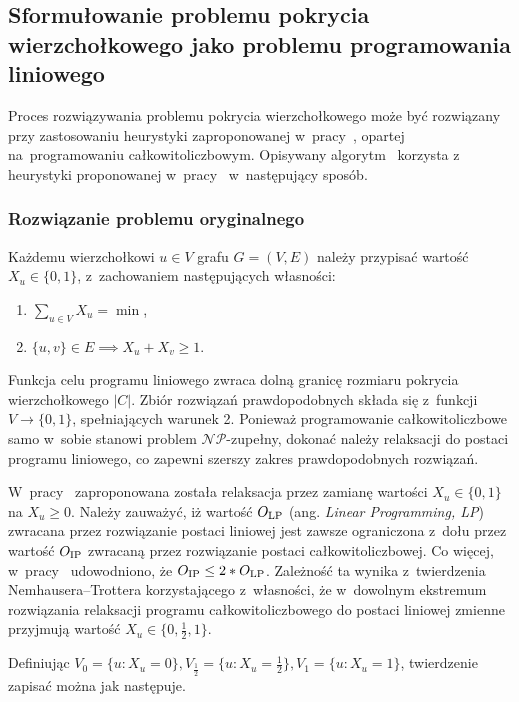 \subsection{Sformułowanie problemu pokrycia wierzchołkowego jako problemu programowania liniowego}\label{section_kernelization_lp_formulation}

Proces rozwiązywania problemu pokrycia wierzchołkowego może być rozwiązany
przy zastosowaniu heurystyki zaproponowanej w~pracy~\cite{hochbaum82}, opartej 
na~programowaniu całkowitoliczbowym.
Opisywany algorytm~\cite[rozdz.~4.2.2]{abukhzam03} korzysta z~ heurystyki proponowanej w~pracy~\cite{hochbaum82} 
w~następujący sposób.

\subsubsection{\textbf{Rozwiązanie problemu oryginalnego}}\label{ss_lp_original}
Każdemu wierzchołkowi $u \in V$ grafu $G=(V,E)$ należy przypisać wartość $X_u
\in \{0, 1\}$, z~zachowaniem następujących własności:
\begin{enumerate}
  \item $\sum_{u \in V}X_u = \min$,
  \item $\{u,v\} \in E \implies X_u + X_v \geq 1$.
\end{enumerate}

Funkcja celu programu liniowego zwraca dolną granicę rozmiaru pokrycia wierzchołkowego $|C|$.
Zbiór rozwiązań prawdopodobnych składa się z~funkcji $V \to \{0, 1\}$,
spełniających warunek 2.
Ponieważ programowanie całkowitoliczbowe samo w~sobie stanowi
problem $\mathcal{NP}$-zupełny, dokonać należy relaksacji do postaci programu liniowego, co
zapewni szerszy zakres prawdopodobnych rozwiązań.

W~pracy~\cite{khuller02} zaproponowana została relaksacja przez zamianę wartości 
$X_u \in \{0,1\}$ na $X_u \geq 0$.
Należy zauważyć, iż wartość $O_{\textnormal{LP}}$ (ang. \emph{Linear Programming, LP}) zwracana przez rozwiązanie postaci 
liniowej jest zawsze ograniczona z~dołu przez wartość $O_{\textnormal{IP}}$ zwracaną przez 
rozwiązanie postaci całkowitoliczbowej.
Co więcej, w~pracy~\cite{khuller02} udowodniono, że $O_{\textnormal{IP}} \leq 2*O_{\textnormal{LP}}$.
Zależność ta wynika z~twierdzenia Nemhausera--Trottera korzystającego
z~własności, że w~dowolnym ekstremum rozwiązania relaksacji programu
całkowitoliczbowego do postaci liniowej zmienne przyjmują wartość 
$X_u \in \{0, \frac{1}{2}, 1\}$.

Definiując $V_0 = \{u : X_u=0\}, V_{\frac{1}{2}}=\{u: X_u=\frac{1}{2}\},
V_1=\{u: X_u=1\}$, twierdzenie zapisać można jak następuje.


